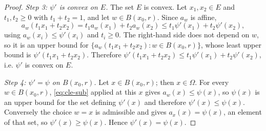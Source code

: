 \begin{proof}
\emph{Step 3: $\psi'$ is convex on $E$.}
The set $E$ is convex. Let $x_1,x_2\in E$ and $t_1,t_2\ge0$ with $t_1+t_2=1$, and
let $w\in B(x_0,r)$. Since $a_w$ is affine,
\[
  a_w(t_1x_1+t_2x_2)=t_1a_w(x_1)+t_2a_w(x_2)\le t_1\psi'(x_1)+t_2\psi'(x_2),
\]
using $a_w(x_i)\le\psi'(x_i)$ and $t_i\ge0$. The right-hand side does not depend
on $w$, so it is an upper bound for $\{a_w(t_1x_1+t_2x_2):w\in B(x_0,r)\}$, whose
least upper bound is $\psi'(t_1x_1+t_2x_2)$. Therefore
$\psi'(t_1x_1+t_2x_2)\le t_1\psi'(x_1)+t_2\psi'(x_2)$, i.e. $\psi'$ is convex on
$E$.

\emph{Step 4: $\psi'=\psi$ on $B(x_0,r)$.}
Let $x\in B(x_0,r)$; then $x\in\Omega$. For every $w\in B(x_0,r)$,
\eqref{eq:cle-sub} applied at this $x$ gives $a_w(x)\le\psi(x)$, so $\psi(x)$ is
an upper bound for the set defining $\psi'(x)$ and therefore
$\psi'(x)\le\psi(x)$. Conversely the choice $w=x$ is admissible and gives
$a_x(x)=\psi(x)$, an element of that set, so $\psi'(x)\ge\psi(x)$. Hence
$\psi'(x)=\psi(x)$.
\end{proof}
